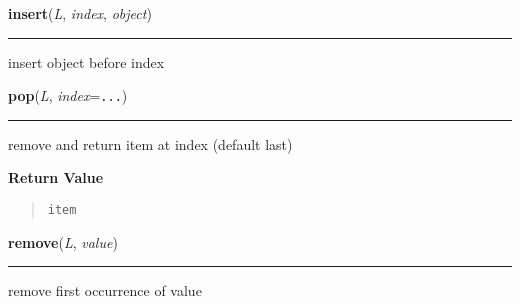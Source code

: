     \label{list:insert}

    \vspace{0.5ex}

    \begin{boxedminipage}{\textwidth}

    \raggedright \textbf{insert}(\textit{L}, \textit{index}, \textit{object})

    \vspace{-1.5ex}

    \rule{\textwidth}{0.5\fboxrule}

insert object before index
    \vspace{1ex}

    \end{boxedminipage}

    \label{list:pop}

    \vspace{0.5ex}

    \begin{boxedminipage}{\textwidth}

    \raggedright \textbf{pop}(\textit{L}, \textit{index}=\texttt{...})

    \vspace{-1.5ex}

    \rule{\textwidth}{0.5\fboxrule}

remove and return item at index (default last)
    \vspace{1ex}

      \textbf{Return Value}
      \begin{quote}
\begin{alltt}
item
\end{alltt}

      \end{quote}

    \vspace{1ex}

    \end{boxedminipage}

    \label{list:remove}

    \vspace{0.5ex}

    \begin{boxedminipage}{\textwidth}

    \raggedright \textbf{remove}(\textit{L}, \textit{value})

    \vspace{-1.5ex}

    \rule{\textwidth}{0.5\fboxrule}

remove first occurrence of value
    \vspace{1ex}

    \end{boxedminipage}

